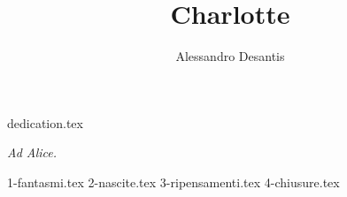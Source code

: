 \documentclass[a4paper,oneside,11pt]{memoir}
\title{Charlotte}
\author{Alessandro Desantis}
\date{}
\begin{document}
    \begin{titlingpage}
        \maketitle
    \end{titlingpage}

    {dedication.tex}
    \begin{dedicationpage}
        \emph{Ad Alice.}
    \end{dedicationpage}


    {1-fantasmi.tex}
    {2-nascite.tex}
    {3-ripensamenti.tex}
    {4-chiusure.tex}
\end{document}
